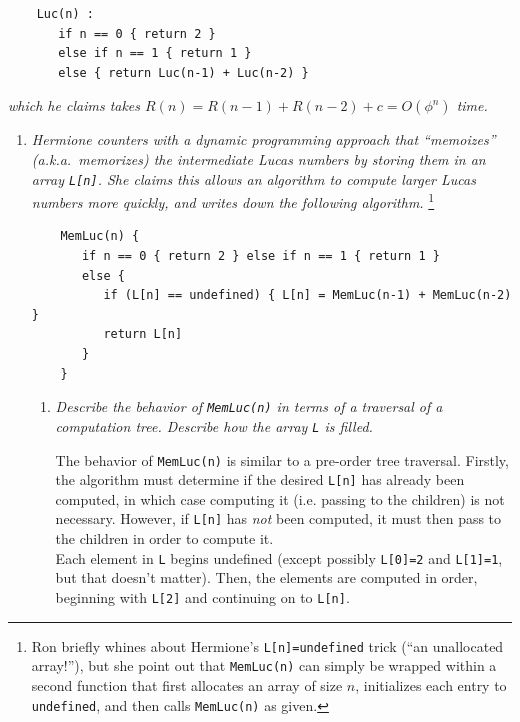 \documentclass[12pt]{article}
\begin{document}
\begin{enumerate}
	\begin{small}
	\begin{verbatim}
	Luc(n) :
	   if n == 0 { return 2 }
	   else if n == 1 { return 1 }
	   else { return Luc(n-1) + Luc(n-2) }
	\end{verbatim}
	\end{small}
	
	\textit{which he claims takes $R(n) = R(n-1) + R(n-2) + c = O(\phi^{n})$ time.}
	
	\begin{enumerate}
	\item \label{q:3:memfib} \textit{Hermione counters with a dynamic programming approach that ``memoizes'' (a.k.a.\ memorizes) the intermediate Lucas numbers by storing them in an array
	{\tt L[n]}. She claims this allows an algorithm to compute larger Lucas numbers more quickly, and writes down the following algorithm.} \footnote{Ron briefly whines about Hermione's {\tt L[n]=undefined} trick (``an 
unallocated array!''), but she point out that {\tt MemLuc(n)} can simply be wrapped within a second function that first allocates an array of size $n$, initializes each entry to {\tt undefined}, and then calls {\tt MemLuc(n)} as 
given.}
	
	\begin{small}
	\begin{verbatim}
	MemLuc(n) {
	   if n == 0 { return 2 } else if n == 1 { return 1 }
	   else {
	      if (L[n] == undefined) { L[n] = MemLuc(n-1) + MemLuc(n-2) }
	      return L[n]
	   }
	}
	\end{verbatim}
	\end{small}
	
	\begin{enumerate}
	\item \textit{Describe the behavior of {\tt MemLuc(n)} in terms of a traversal of a computation tree. Describe how the array {\tt L} is filled.}
	
	The behavior of {\tt MemLuc(n)} is similar to a pre-order tree traversal. Firstly, the algorithm must determine if the desired {\tt L[n]} has already been computed, in which case computing it (i.e. passing to the children) 
is not necessary. However, if {\tt L[n]} has \textit{not} been computed, it must then pass to the children in order to compute it.\\
	
	Each element in {\tt L} begins undefined (except possibly {\tt L[0]=2} and {\tt L[1]=1}, but that doesn't matter). Then, the elements are computed in order, beginning with {\tt L[2]} and continuing on to {\tt L[n]}.\\
	

\end{enumerate}
\end{enumerate}
\end{enumerate}
\end{document}

